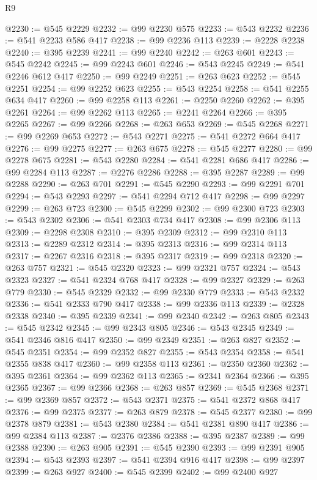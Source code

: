 \begin{lexlean}{R9}
\begin{coremodule}
{{{{{{{{{{{{{{{{{{{{{{{{{{{{{{{{{{{{{{{{{{{{{{{{{{{{{{{{{{{{{{{{{{{{{{{{{{{{{{{{{{{{@2230 := @545 @2229
@2232 := @99 @2230 @575
@2233 := @543 @2232
@2236 := @541 @2233 @586 @417
@2238 := @99 @2236 @113
@2239 := @2228 @2238
@2240 := @395 @2239
@2241 := @99 @2240
@2242 := @263 @601
@2243 := @545 @2242
@2245 := @99 @2243 @601
@2246 := @543 @2245
@2249 := @541 @2246 @612 @417
@2250 := @99 @2249
@2251 := @263 @623
@2252 := @545 @2251
@2254 := @99 @2252 @623
@2255 := @543 @2254
@2258 := @541 @2255 @634 @417
@2260 := @99 @2258 @113
@2261 := @2250 @2260
@2262 := @395 @2261
@2264 := @99 @2262 @113
@2265 := @2241 @2264
@2266 := @395 @2265
@2267 := @99 @2266
@2268 := @263 @653
@2269 := @545 @2268
@2271 := @99 @2269 @653
@2272 := @543 @2271
@2275 := @541 @2272 @664 @417
@2276 := @99 @2275
@2277 := @263 @675
@2278 := @545 @2277
@2280 := @99 @2278 @675
@2281 := @543 @2280
@2284 := @541 @2281 @686 @417
@2286 := @99 @2284 @113
@2287 := @2276 @2286
@2288 := @395 @2287
@2289 := @99 @2288
@2290 := @263 @701
@2291 := @545 @2290
@2293 := @99 @2291 @701
@2294 := @543 @2293
@2297 := @541 @2294 @712 @417
@2298 := @99 @2297
@2299 := @263 @723
@2300 := @545 @2299
@2302 := @99 @2300 @723
@2303 := @543 @2302
@2306 := @541 @2303 @734 @417
@2308 := @99 @2306 @113
@2309 := @2298 @2308
@2310 := @395 @2309
@2312 := @99 @2310 @113
@2313 := @2289 @2312
@2314 := @395 @2313
@2316 := @99 @2314 @113
@2317 := @2267 @2316
@2318 := @395 @2317
@2319 := @99 @2318
@2320 := @263 @757
@2321 := @545 @2320
@2323 := @99 @2321 @757
@2324 := @543 @2323
@2327 := @541 @2324 @768 @417
@2328 := @99 @2327
@2329 := @263 @779
@2330 := @545 @2329
@2332 := @99 @2330 @779
@2333 := @543 @2332
@2336 := @541 @2333 @790 @417
@2338 := @99 @2336 @113
@2339 := @2328 @2338
@2340 := @395 @2339
@2341 := @99 @2340
@2342 := @263 @805
@2343 := @545 @2342
@2345 := @99 @2343 @805
@2346 := @543 @2345
@2349 := @541 @2346 @816 @417
@2350 := @99 @2349
@2351 := @263 @827
@2352 := @545 @2351
@2354 := @99 @2352 @827
@2355 := @543 @2354
@2358 := @541 @2355 @838 @417
@2360 := @99 @2358 @113
@2361 := @2350 @2360
@2362 := @395 @2361
@2364 := @99 @2362 @113
@2365 := @2341 @2364
@2366 := @395 @2365
@2367 := @99 @2366
@2368 := @263 @857
@2369 := @545 @2368
@2371 := @99 @2369 @857
@2372 := @543 @2371
@2375 := @541 @2372 @868 @417
@2376 := @99 @2375
@2377 := @263 @879
@2378 := @545 @2377
@2380 := @99 @2378 @879
@2381 := @543 @2380
@2384 := @541 @2381 @890 @417
@2386 := @99 @2384 @113
@2387 := @2376 @2386
@2388 := @395 @2387
@2389 := @99 @2388
@2390 := @263 @905
@2391 := @545 @2390
@2393 := @99 @2391 @905
@2394 := @543 @2393
@2397 := @541 @2394 @916 @417
@2398 := @99 @2397
@2399 := @263 @927
@2400 := @545 @2399
@2402 := @99 @2400 @927
}}}}}}}}}}}}}}}}}}}}}}}}}}}}}}}}}}}}}}}}}}}}}}}}}}}}}}}}}}}}}}}}}}}}}}}}}}}}}}}}}}}}
\end{coremodule}
\end{lexlean}
